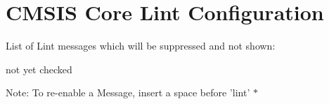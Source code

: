 \hypertarget{group___c_m_s_i_s__core___lint_cinfiguration}{\section{\-C\-M\-S\-I\-S \-Core \-Lint \-Configuration}
\label{group___c_m_s_i_s__core___lint_cinfiguration}
}
\-List of \-Lint messages which will be suppressed and not shown\-:
\begin{DoxyItemize}
\item not yet checked
\end{DoxyItemize}

\-Note\-: \-To re-\/enable a \-Message, insert a space before 'lint' $\ast$ 